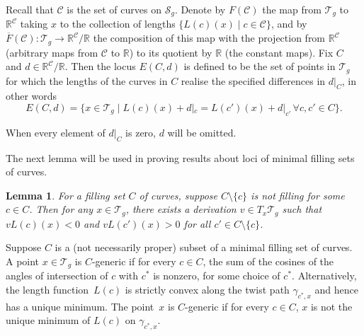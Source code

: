 \documentclass[11pt]{article}
\numberwithin{equation}{section}
\numberwithin{equation}{section}
\newtheorem{Lemma}[Theorem]{Lemma}
\begin{document}
Recall that $\mathcal{C}$ is the set of curves on $\mathcal{S}_{g}$. Denote by $F(\mathcal{C})$ the map from $\mathcal{T}_{g}$ to $\mathbb{R}^{\mathcal{C}}$ taking $x$ to the collection of lengths $\{L(c)(x) \mid c\in \mathcal{C}\}$, and by $\overline{F}(\mathcal{C})\colon\mathcal{T}_{g}\rightarrow \mathbb{R}^{\mathcal{C}}/\mathbb{R}$ the composition of this map with the projection from $\mathbb{R}^{\mathcal{C}}$ (arbitrary maps from $\mathcal{C}$ to $\mathbb{R}$) to its quotient by $\mathbb{R}$ (the constant maps). Fix $C$ and $d\in \mathbb{R}^{\mathcal{C}}/\mathbb{R}$. Then the locus $E(C,d)$ is defined to be the set of points in $\mathcal{T}_{g}$ for which the lengths of the curves in $C$ realise the specified differences in $d|_{C}$, in other words
\begin{equation}
\label{withd}
E(C,d)=\{x\in \mathcal{T}_{g} \mid L(c)(x)+d|_{c}=L(c')(x)+d|_{c'} \, \forall c,c'\in C\}.
\end{equation}

When every element of $d|_{C}$ is zero, $d$ will be omitted.

The next lemma will be used in proving results about loci of minimal filling sets of curves.

\begin{Lemma}\label{LipschitzMap}
For a filling set $C$ of curves, suppose $C\setminus \{c\}$ is not filling for some $c\in C$. Then for any $x\in \mathcal{T}_{g}$, there exists a derivation $v\in T_{x}\mathcal{T}_{g}$ such that $vL(c)(x)<0$ and $vL(c')(x)>0$ for all $c'\in C\setminus \{c\}$.
\end{Lemma}

\begin{Definition}[$C$-generic]
Suppose $C$ is a (not necessarily proper) subset of a minimal filling set of curves. A point $x\in \mathcal{T}_{g}$ is $C$-generic if for every $c\in C$, the sum of the cosines of the angles of intersection of $c$ with $c^{*}$ is nonzero, for some choice of $c^{*}$. Alternatively, the length function~$L(c)$ is strictly convex along the twist path $\gamma_{c^{*},x}$ and hence has a unique minimum. The point~$x$ is $C$-generic if for every $c\in C$, $x$ is not the unique minimum of $L(c)$ on $\gamma_{c^{*},x}$.
\end{Definition}
\end{document}
